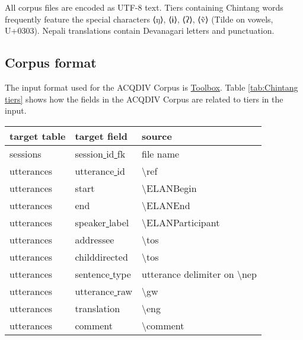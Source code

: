 \documentclass[a4paper, 11pt]{book}
\newcommand{\bks}{\textbackslash}	%
\newcommand{\und}{\underline{{ }}\hspace{0.2mm}}	%
\begin{document}
All corpus files are encoded as UTF-8 text. Tiers containing Chintang words frequently feature the special characters ⟨ŋ⟩, ⟨ɨ⟩, ⟨ʔ⟩, ⟨ṽ⟩ (Tilde on vowels, U+0303). Nepali translations contain Devanagari letters and punctuation. 

\subsection{Corpus format}

The input format used for the ACQDIV Corpus is \hyperref[subsec:Toolbox]{Toolbox}. Table \autoref{tab:Chintang tiers} shows how the fields in the ACQDIV Corpus are related to tiers in the input.

\begin{table}[ht!]
	\centering
	\begin{tabular}{lll}
		\toprule
			\textbf{target table} & \textbf{target field} & \textbf{source} \\
		\midrule 
			sessions 	& session\und id\und fk & file name \\
			utterances 	& utterance\und id		& \bks ref \\
			utterances 	& start					& \bks ELANBegin \\
			utterances 	& end					& \bks ELANEnd \\
			utterances 	& speaker\und label		& \bks ELANParticipant \\
			utterances 	& addressee				& \bks tos \\
			utterances 	& childdirected			& \bks tos \\
			utterances 	& sentence\und type		& utterance delimiter on \bks nep \\
			utterances 	& utterance\und raw		& \bks gw \\
			utterances 	& translation			& \bks eng \\
			utterances 	& comment				& \bks comment \\ %

\end{tabular}
\end{table}
\end{document}
